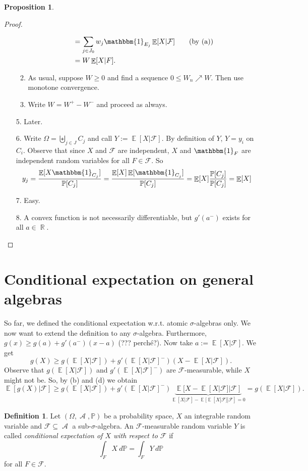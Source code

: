 \documentclass[12pt,a4paper]{report}
\theoremstyle{definition}
\newtheorem{proposition}[theorem]{Proposition}
\newtheorem{definition}[theorem]{Definition}
\theoremstyle{num.custom-title}
\DeclareMathOperator{\A}{\mathcal{A}}
\DeclareMathOperator{\E}{\mathbb{E}}
\DeclareMathOperator{\R}{\mathbb{R}}
\DeclareMathOperator{\sse}{\subseteq}
\newcommand{\F}{\mathcal{F}}
\renewcommand{\1}{\mathbbm{1}}
\renewcommand{\P}{\mathbb{P}}
\begin{document}
\begin{proposition}
\begin{proof}
\begin{enumerate}
\begin{enumerate}
\begin{align*}
&= \sum_{j \in J_0} w_j \1_{E_j} \E[X | \F] \tag{by (a)} \\
&= W\E[X|F].
\end{align*}
\item As usual, suppose $W \geq 0$ and find a sequence $0 \leq W_n \nearrow W$. Then use monotone convergence.
\item Write $W=W^+-W^-$ and proceed as always.
\end{enumerate}
\item[5.] Later.
\item[6.] Write $\Omega = \biguplus_{j \in J} C_j$ and call $Y := \E[X|\F]$. By definition of $Y$, $Y=y_i$ on $C_i$. Observe that since $X$ and $\F$ are independent, $X$ and $\1_F$ are independent random variables for all $F \in \F$. So
\[
y_j = \frac{\E[X \1_{C_j}]}{\P[C_j]} = \frac{\E[X] \E[\1_{C_j}]}{\P[C_j]} = \E[X] \frac{\P[C_j]}{\P[C_j]} = \E[X]
\]
\item[7.] Easy.
\item[8.] A convex function is not necessarily differentiable, but $g'(a^-)$ exists for all $a \in \R$.
\end{enumerate}
\end{proof}
\end{proposition}

\section{Conditional expectation on general algebras}

So far, we defined the conditional expectation w.r.t. atomic $\sigma$-algebras only. We now want to extend the definition to any $\sigma$-algebra. Furthermore, $g(x) \geq g(a)+g'(a^-)(x-a)$ (??? perché?). Now take $a := \E[X|\F]$. We get
\[
g(X) \geq g(\E[X|\F]) + g'(\E[X|\F]^-)(X-\E[X|\F]).
\]
Observe that $g(\E[X|\F])$ and $g'(\E[X|\F]^-)$ are $\F$-measurable, while $X$ might not be. So, by (b) and (d) we obtain
\[
\E[g(X)|\F] \geq g(\E[X|\F]) + g'(\E[X|\F]^-) \underbrace{\E[X-\E[X|\F] | \F]}_{\E[X|\F] - \E[\E[X|\F]|\F] =0} = g(\E[X|\F]).
\]

\begin{definition}
Let $(\Omega,\A,\P)$ be a probability space, $X$ an integrable random variable and $\F \sse \A$ a sub-$\sigma$-algebra. An $\F$-measurable random variable $Y$ is called \emph{conditional expectation of $X$ with respect to $\F$} if
\[
\int_F X \ d\P = \int_F Y \ d\P
\]
for all $F \in \F$.
\end{definition}
\end{document}
